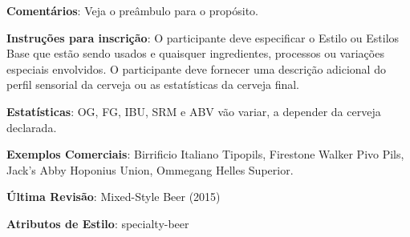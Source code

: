 \textbf{Comentários}: Veja o preâmbulo para o propósito.

\textbf{Instruções para inscrição}: O participante deve especificar o Estilo ou Estilos Base que estão sendo usados e quaisquer ingredientes, processos ou variações especiais envolvidos. O participante deve fornecer uma descrição adicional do perfil sensorial da cerveja ou as estatísticas da cerveja final.

\textbf{Estatísticas}: OG, FG, IBU, SRM e ABV vão variar, a depender da cerveja declarada.

\textbf{Exemplos Comerciais}: Birrificio Italiano Tipopils, Firestone Walker Pivo Pils, Jack’s Abby Hoponius Union, Ommegang Helles Superior.

\textbf{Última Revisão}: Mixed-Style Beer (2015)

\textbf{Atributos de Estilo}: specialty-beer
